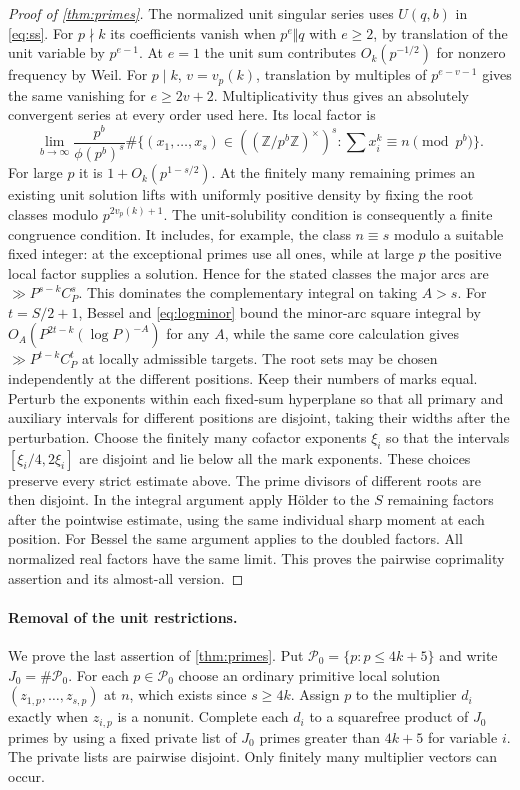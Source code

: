 \documentclass[11pt,letterpaper]{article}
\theoremstyle{definition}
\newcommand{\Z}{\mathbb Z}
\begin{document}
\begin{proof}[Proof of \cref{thm:primes}]
The normalized unit singular series uses $U(q,b)$ in \eqref{eq:ss}.
For $p\nmid k$ its coefficients vanish when $p^e\Vert q$ with
$e\ge2$, by translation of the unit variable by $p^{e-1}$.
At $e=1$ the unit sum contributes $O_k(p^{-1/2})$ for nonzero
frequency by Weil. For $p\mid k$, $v=v_p(k)$, translation by
multiples of $p^{e-v-1}$ gives the same vanishing for $e\ge2v+2$.
Multiplicativity thus gives an absolutely convergent series at
every order used here. Its local factor is
\[
 \lim_{b\to\infty}\frac{p^b}{\phi(p^b)^s}
 \#\{(x_1,\ldots,x_s)\in((\Z/p^b\Z)^\times)^s:
                  \textstyle\sum x_i^k\equiv n\pmod{p^b}\}.
\]
For large $p$ it is $1+O_k(p^{1-s/2})$. At the finitely many
remaining primes an existing unit solution lifts with uniformly positive
density by fixing the root classes modulo $p^{2v_p(k)+1}$.
The unit-solubility condition is consequently a finite congruence
condition. It includes, for example, the class $n\equiv s$ modulo
a suitable fixed integer: at the exceptional primes use all ones,
while at large $p$ the positive local factor supplies a solution.
Hence for the stated classes the major arcs are
$\gg P^{s-k}C_P^s$. This dominates the complementary integral on
taking $A>s$. For $t=S/2+1$, Bessel and \eqref{eq:logminor} bound
the minor-arc square integral by $O_A(P^{2t-k}(\log P)^{-A})$ for any
$A$, while the same core calculation gives $\gg P^{t-k}C_P^t$ at
locally admissible targets. The root sets may be chosen independently at the different positions.
Keep their numbers of marks equal. Perturb the exponents within each
fixed-sum hyperplane so that all primary and auxiliary intervals for
different positions are disjoint, taking their widths after the
perturbation. Choose the finitely many cofactor exponents $\xi_i$ so
that the intervals $[\xi_i/4,2\xi_i]$ are disjoint and lie below
all the mark exponents. These choices preserve every strict estimate
above. The prime divisors of different roots are then disjoint. In the
integral argument apply H\"older to the $S$ remaining factors after
the pointwise estimate, using the same individual sharp moment at each
position. For Bessel the same argument applies to the doubled factors.
All normalized real factors have the same limit. This proves the
pairwise coprimality assertion and its almost-all version.
\end{proof}

\paragraph{Removal of the unit restrictions.}
We prove the last assertion of \cref{thm:primes}. Put
$\mathcal P_0=\{p:p\le4k+5\}$ and write $J_0=\#\mathcal P_0$.
For each $p\in\mathcal P_0$ choose an ordinary primitive local
solution $(z_{1,p},\ldots,z_{s,p})$ at $n$, which exists since $s\ge4k$.
Assign $p$ to the multiplier $d_i$ exactly when $z_{i,p}$ is a nonunit.
Complete each $d_i$ to a squarefree product of $J_0$ primes by using
a fixed private list of $J_0$ primes greater than $4k+5$ for variable $i$.
The private lists are pairwise disjoint. Only finitely many multiplier
vectors can occur.
\end{document}
